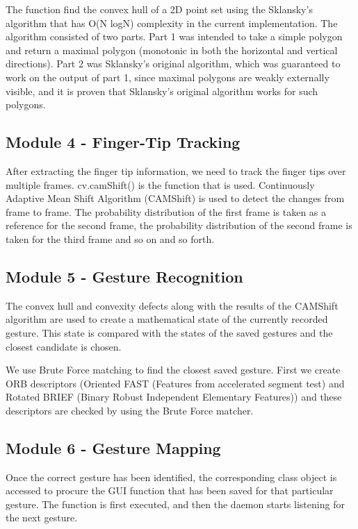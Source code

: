\documentclass[11pt]{report}
\begin{document}
 The function find the convex hull of a 2D point set using the Sklansky’s algorithm
 that has O(N logN) complexity in the current implementation. The algorithm consisted of two parts. 
 Part 1 was intended to take a simple polygon and return a maximal polygon (monotonic in both the 
 horizontal and vertical directions). Part 2 was Sklansky's original algorithm, which
 was guaranteed to work on the output of part 1, since maximal polygons are weakly externally visible,
 and it is proven that Sklansky's original algorithm works for such polygons.

\subsection{Module 4 - Finger-Tip Tracking}
After extracting the finger tip information, we need to track the finger tips over multiple frames. 
cv.camShift() is the function that is used. 
Continuously Adaptive Mean Shift Algorithm (CAMShift) is used to detect the changes from frame to frame. 
The probability distribution of the first frame is taken as a reference for the second frame, 
the probability distribution of the second frame is taken for the third frame and so on and so forth.

\subsection{Module 5 - Gesture Recognition}
The convex hull and convexity defects along with the results of the CAMShift algorithm are 
used to create a mathematical state of the currently recorded gesture. This state is compared 
with the states of the saved gestures and the closest candidate is chosen.

We use Brute Force matching to find the closest saved gesture. First we create 
ORB descriptors (Oriented FAST (Features from accelerated segment test) and Rotated BRIEF 
(Binary Robust Independent Elementary Features)) and these descriptors are checked by using the 
Brute Force matcher.  

\subsection{Module 6 - Gesture Mapping}

Once the correct gesture has been identified, 
the corresponding class object is accessed to procure the GUI function that has been saved 
for that particular gesture. The function is first executed, and then the daemon starts listening 
for the next gesture.
\end{document}
